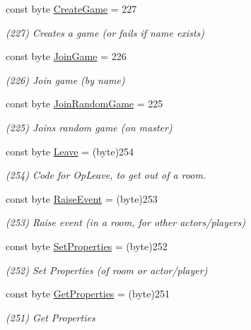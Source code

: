 \begin{DoxyCompactItemize}
const byte \hyperlink{class_exit_games_1_1_client_1_1_photon_1_1_operation_code_a4ec87e6ee50ba49c669644c242053854}{Create\+Game} = 227
\begin{DoxyCompactList}\small\item\em (227) Creates a game (or fails if name exists)\end{DoxyCompactList}\item 
const byte \hyperlink{class_exit_games_1_1_client_1_1_photon_1_1_operation_code_a98972f7fc4a8965ef0597387b298bba2}{Join\+Game} = 226
\begin{DoxyCompactList}\small\item\em (226) Join game (by name)\end{DoxyCompactList}\item 
const byte \hyperlink{class_exit_games_1_1_client_1_1_photon_1_1_operation_code_a43219f5aad29ff41925811ef959dd442}{Join\+Random\+Game} = 225
\begin{DoxyCompactList}\small\item\em (225) Joins random game (on master)\end{DoxyCompactList}\item 
const byte \hyperlink{class_exit_games_1_1_client_1_1_photon_1_1_operation_code_aa11e391e152516015f509f474f6ac7ce}{Leave} = (byte)254
\begin{DoxyCompactList}\small\item\em (254) Code for Op\+Leave, to get out of a room.\end{DoxyCompactList}\item 
const byte \hyperlink{class_exit_games_1_1_client_1_1_photon_1_1_operation_code_a629f95f520a21f28345366d84d9171bf}{Raise\+Event} = (byte)253
\begin{DoxyCompactList}\small\item\em (253) Raise event (in a room, for other actors/players)\end{DoxyCompactList}\item 
const byte \hyperlink{class_exit_games_1_1_client_1_1_photon_1_1_operation_code_a1e9bdcbf6be26d2157af2df0daaef988}{Set\+Properties} = (byte)252
\begin{DoxyCompactList}\small\item\em (252) Set Properties (of room or actor/player)\end{DoxyCompactList}\item 
const byte \hyperlink{class_exit_games_1_1_client_1_1_photon_1_1_operation_code_a7bfd447d57b228deb49cf59b9d442047}{Get\+Properties} = (byte)251
\begin{DoxyCompactList}\small\item\em (251) Get Properties\end{DoxyCompactList}\item 

\end{DoxyCompactItemize}
